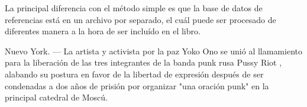 \documentclass{article}
\begin{document}
La principal diferencia con el método simple es que la base de datos de referencias está en un archivo por separado, el cuál puede ser procesado de diferentes manera a la hora de ser incluído en el libro.

Nuevo York. — La artista y activista por la paz Yoko Ono \cite{primero} se unió al llamamiento para la liberación de las tres integrantes de la banda punk rusa Pussy Riot \cite{segundo}, alabando su postura \cite[p. 2]{tercero} en favor de la libertad de expresión después de ser condenadas a dos años de prisión por organizar "una oración punk" en la principal catedral de Moscú.



	
\end{document}
